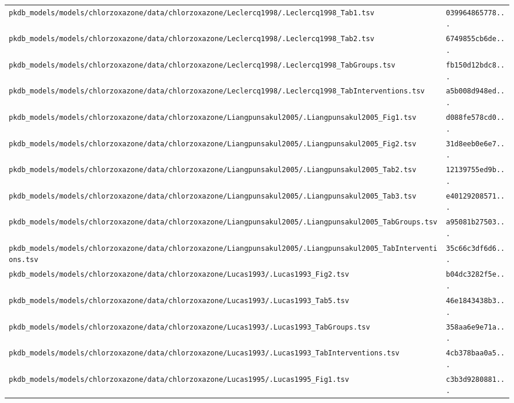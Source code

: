 \begin{longtable}{ll}
\texttt{pkdb\_models/models/chlorzoxazone/data/chlorzoxazone/Leclercq1998/.Leclercq1998\_Tab1.tsv} & \texttt{039964865778...} \\
\texttt{pkdb\_models/models/chlorzoxazone/data/chlorzoxazone/Leclercq1998/.Leclercq1998\_Tab2.tsv} & \texttt{6749855cb6de...} \\
\texttt{pkdb\_models/models/chlorzoxazone/data/chlorzoxazone/Leclercq1998/.Leclercq1998\_TabGroups.tsv} & \texttt{fb150d12bdc8...} \\
\texttt{pkdb\_models/models/chlorzoxazone/data/chlorzoxazone/Leclercq1998/.Leclercq1998\_TabInterventions.tsv} & \texttt{a5b008d948ed...} \\
\texttt{pkdb\_models/models/chlorzoxazone/data/chlorzoxazone/Liangpunsakul2005/.Liangpunsakul2005\_Fig1.tsv} & \texttt{d088fe578cd0...} \\
\texttt{pkdb\_models/models/chlorzoxazone/data/chlorzoxazone/Liangpunsakul2005/.Liangpunsakul2005\_Fig2.tsv} & \texttt{31d8eeb0e6e7...} \\
\texttt{pkdb\_models/models/chlorzoxazone/data/chlorzoxazone/Liangpunsakul2005/.Liangpunsakul2005\_Tab2.tsv} & \texttt{12139755ed9b...} \\
\texttt{pkdb\_models/models/chlorzoxazone/data/chlorzoxazone/Liangpunsakul2005/.Liangpunsakul2005\_Tab3.tsv} & \texttt{e40129208571...} \\
\texttt{pkdb\_models/models/chlorzoxazone/data/chlorzoxazone/Liangpunsakul2005/.Liangpunsakul2005\_TabGroups.tsv} & \texttt{a95081b27503...} \\
\texttt{pkdb\_models/models/chlorzoxazone/data/chlorzoxazone/Liangpunsakul2005/.Liangpunsakul2005\_TabInterventions.tsv} & \texttt{35c66c3df6d6...} \\
\texttt{pkdb\_models/models/chlorzoxazone/data/chlorzoxazone/Lucas1993/.Lucas1993\_Fig2.tsv} & \texttt{b04dc3282f5e...} \\
\texttt{pkdb\_models/models/chlorzoxazone/data/chlorzoxazone/Lucas1993/.Lucas1993\_Tab5.tsv} & \texttt{46e1843438b3...} \\
\texttt{pkdb\_models/models/chlorzoxazone/data/chlorzoxazone/Lucas1993/.Lucas1993\_TabGroups.tsv} & \texttt{358aa6e9e71a...} \\
\texttt{pkdb\_models/models/chlorzoxazone/data/chlorzoxazone/Lucas1993/.Lucas1993\_TabInterventions.tsv} & \texttt{4cb378baa0a5...} \\
\texttt{pkdb\_models/models/chlorzoxazone/data/chlorzoxazone/Lucas1995/.Lucas1995\_Fig1.tsv} & \texttt{c3b3d9280881...} \\

\end{longtable}
